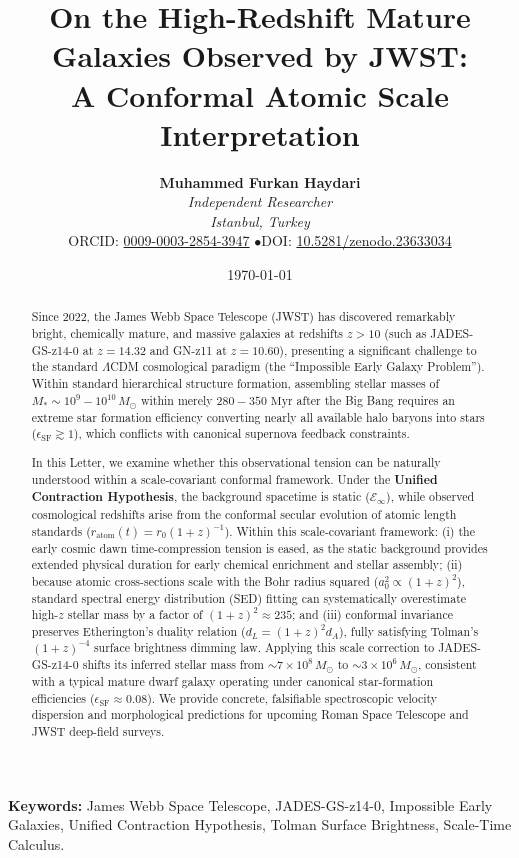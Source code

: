 \documentclass[11pt,a4paper]{article}
\title{\textbf{On the High-Redshift Mature Galaxies Observed by JWST: \\ A Conformal Atomic Scale Interpretation}}
\author{
    \textbf{Muhammed Furkan Haydari} \\
    \textit{Independent Researcher} \\
    \textit{Istanbul, Turkey} \\
    \small ORCID: \href{https://orcid.org/0009-0003-2854-3947}{0009-0003-2854-3947} \quad$\bullet$\quad \small DOI: \href{https://doi.org/10.5281/zenodo.23633034}{10.5281/zenodo.23633034}
}
\date{\today}
\begin{document}
\maketitle

\begin{abstract}
    Since 2022, the James Webb Space Telescope (JWST) has discovered remarkably bright, chemically mature, and massive galaxies at redshifts $z > 10$ (such as JADES-GS-z14-0 at $z = 14.32$ and GN-z11 at $z = 10.60$), presenting a significant challenge to the standard $\Lambda$CDM cosmological paradigm (the ``Impossible Early Galaxy Problem''). Within standard hierarchical structure formation, assembling stellar masses of $M_* \sim 10^9 - 10^{10}\,M_\odot$ within merely $280-350\text{ Myr}$ after the Big Bang requires an extreme star formation efficiency converting nearly all available halo baryons into stars ($\epsilon_{\mathrm{SF}} \gtrsim 1$), which conflicts with canonical supernova feedback constraints.

    In this Letter, we examine whether this observational tension can be naturally understood within a scale-covariant conformal framework. Under the \textbf{Unified Contraction Hypothesis}, the background spacetime is static ($\mathcal{E}_\infty$), while observed cosmological redshifts arise from the conformal secular evolution of atomic length standards ($r_{\mathrm{atom}}(t) = r_0 (1+z)^{-1}$). Within this scale-covariant framework: (i) the early cosmic dawn time-compression tension is eased, as the static background provides extended physical duration for early chemical enrichment and stellar assembly; (ii) because atomic cross-sections scale with the Bohr radius squared ($a_0^2 \propto (1+z)^2$), standard spectral energy distribution (SED) fitting can systematically overestimate high-$z$ stellar mass by a factor of $(1+z)^2 \approx 235$; and (iii) conformal invariance preserves Etherington's duality relation ($d_L = (1+z)^2 d_A$), fully satisfying Tolman's $(1+z)^{-4}$ surface brightness dimming law. Applying this scale correction to JADES-GS-z14-0 shifts its inferred stellar mass from $\sim 7 \times 10^8\,M_\odot$ to $\sim 3 \times 10^6\,M_\odot$, consistent with a typical mature dwarf galaxy operating under canonical star-formation efficiencies ($\epsilon_{\mathrm{SF}} \approx 0.08$). We provide concrete, falsifiable spectroscopic velocity dispersion and morphological predictions for upcoming Roman Space Telescope and JWST deep-field surveys.
\end{abstract}

\vspace{1em}
\noindent\textbf{Keywords:} James Webb Space Telescope, JADES-GS-z14-0, Impossible Early Galaxies, Unified Contraction Hypothesis, Tolman Surface Brightness, Scale-Time Calculus.
\end{document}
